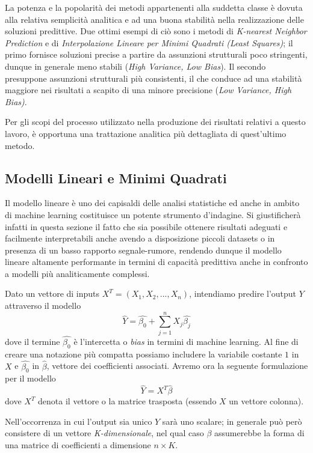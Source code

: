 \documentclass[a4paper]{report}
\begin{document}
La potenza e la popolarità dei metodi appartenenti alla suddetta classe è dovuta alla relativa semplicità analitica e ad una buona stabilità nella realizzazione delle soluzioni predittive.
Due ottimi esempi di ciò sono i metodi di \textit{K-nearest Neighbor Prediction} e di \textit{Interpolazione Lineare per Minimi Quadrati (Least Squares)}; il primo fornisce soluzioni precise a partire da assunzioni strutturali poco stringenti, dunque in generale meno stabili (\textit{High Variance, Low Bias}).
Il secondo presuppone assunzioni strutturali più consistenti, il che conduce ad una stabilità maggiore nei risultati a scapito di una minore precisione (\textit{Low Variance, High Bias)}.

Per gli scopi del processo utilizzato nella produzione dei risultati relativi a questo lavoro, è opportuna una trattazione analitica più dettagliata di quest'ultimo metodo.

\subsection{Modelli Lineari e Minimi Quadrati}
Il modello lineare è uno dei capisaldi delle analisi statistiche ed anche in ambito di machine learning costituisce un potente strumento d'indagine.
Si giustificherà infatti in questa sezione il fatto che sia possibile ottenere risultati adeguati e facilmente interpretabili anche avendo a disposizione piccoli datasets o in presenza di un basso rapporto segnale-rumore, rendendo dunque il modello lineare altamente performante in termini di capacità predittiva anche in confronto a modelli più analiticamente complessi.

Dato un vettore di inputs  $X^T = (X_1,X_2,...,X_n)$, intendiamo predire l'output $Y$ attraverso il modello \[\hat{Y}=\hat{\beta_0}+\sum_{j=1}^{n}X_j\hat{\beta_j}\] dove il termine $\hat{\beta_0}$ è l'intercetta o \textit{bias} in termini di machine learning.
Al fine di creare una notazione più compatta possiamo includere la variabile costante $1$ in $X$ e $\hat{\beta_0}$ in $\hat{\beta}$, vettore dei coefficienti associati. Avremo ora la seguente formulazione per il modello \[\hat{Y}=X^T\hat{\beta}\] dove $X^T$ denota il vettore o la matrice trasposta (essendo $X$ un vettore colonna).

Nell'occorrenza in cui l'output sia unico $Y$ sarà uno scalare; in generale può però consistere di un vettore \textit{K-dimensionale}, nel qual caso $\beta$ assumerebbe la forma di una matrice di coefficienti a dimensione $n\times K$.
\end{document}
